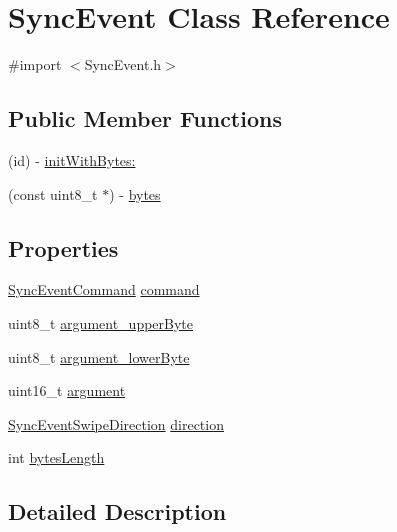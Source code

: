 \hypertarget{interface_sync_event}{
\section{SyncEvent Class Reference}
\label{interface_sync_event}
}


{\ttfamily \#import $<$SyncEvent.h$>$}

\subsection*{Public Member Functions}
\begin{DoxyCompactItemize}
\item 
(id) -\/ \hyperlink{interface_sync_event_a3f7fdc48c3c3cab2371b8adf14de9b99}{initWithBytes:}
\item 
(const uint8\_\-t $\ast$) -\/ \hyperlink{interface_sync_event_a484f93618ed90870534d4632b0bb811b}{bytes}
\end{DoxyCompactItemize}
\subsection*{Properties}
\begin{DoxyCompactItemize}
\item 
\hyperlink{_sync_event_8h_a20f1caea2d3fefad8cc1d9eb9b8f7d34}{SyncEventCommand} \hyperlink{interface_sync_event_aa6a5afb0f81c492c56b326c711e72aff}{command}
\item 
uint8\_\-t \hyperlink{interface_sync_event_aabc9ba86996bb61d9eb530b84f5a16f9}{argument\_\-upperByte}
\item 
uint8\_\-t \hyperlink{interface_sync_event_a4300b74bd54ca339d5fdbf0187a32d50}{argument\_\-lowerByte}
\item 
uint16\_\-t \hyperlink{interface_sync_event_a74dff7bd5049f91fd54db0388f730206}{argument}
\item 
\hyperlink{_sync_event_8h_acace9ff8e6c7501a7db172418a364d04}{SyncEventSwipeDirection} \hyperlink{interface_sync_event_af2e9a1b1dcae54a6d29d4ab3ea82ac36}{direction}
\item 
int \hyperlink{interface_sync_event_a539fd2db1da9757b1e4cb56c56313b91}{bytesLength}
\end{DoxyCompactItemize}


\subsection{Detailed Description}


